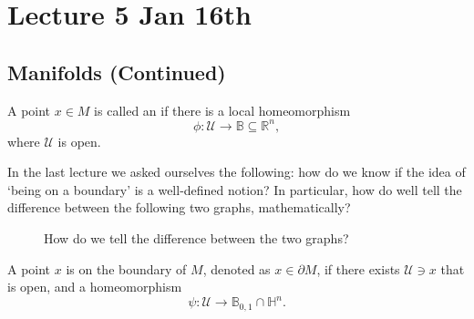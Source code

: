 \documentclass[notoc,notitlepage]{tufte-book}
\begin{document}
\chapter{Lecture 5 Jan 16th}%
\label{chp:lecture_5_jan_16th}

\section{Manifolds (Continued)}%
\label{sec:manifolds_continued}

\begin{defn}\label{defn:interior_point}
  A point $x \in M$ is called an  if there is a local
  homeomorphism
  \begin{equation*}
    \phi : \mathcal{U} \to \mathbb{B} \subseteq \mathbb{R}^n,
  \end{equation*}
  where $\mathcal{U}$ is open.
\end{defn}

In the last lecture we asked ourselves the following: how do we know if the
idea of `being on a boundary' is a well-defined notion? In particular, how
do well tell the difference between the following two graphs, mathematically?

\begin{figure}[ht]
  \centering
  \caption{How do we tell the difference between the two graphs?}
  \label{fig:r_n_vs_h_n}
\end{figure}

\begin{defn}\label{defn:boundary_point}
  A point $x$ is on the boundary of $M$, denoted as $x \in \partial M$, if
  there exists $\mathcal{U} \ni x$ that is open, and a homeomorphism
  \begin{equation*}
    \psi : \mathcal{U} \to \mathbb{B}_{0, 1} \cap \mathbb{H}^n.
  \end{equation*}
\end{defn}
\end{document}
